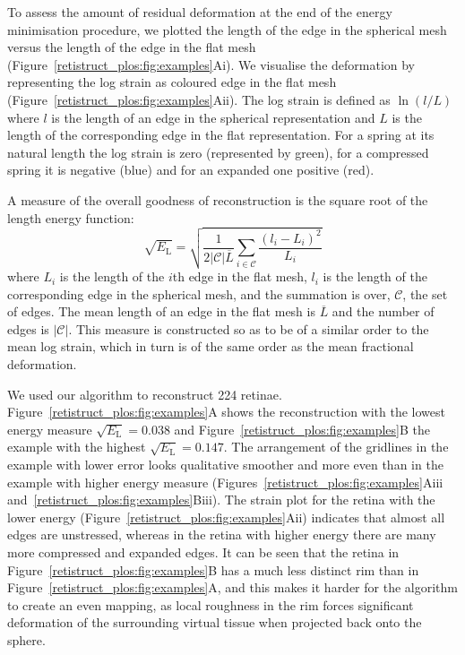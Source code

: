 \documentclass[10pt]{article}
\begin{document}
To assess the amount of residual deformation at the end of the energy
minimisation procedure, we plotted the length of the edge in the
spherical mesh versus the length of the edge in the flat mesh
(Figure~\ref{retistruct_plos:fig:examples}Ai). We visualise the
deformation by representing the log strain as coloured edge in the
flat mesh (Figure~\ref{retistruct_plos:fig:examples}Aii). The log
strain is defined as $\ln(l/L)$ where $l$ is the length of an edge in
the spherical representation and $L$ is the length of the
corresponding edge in the flat representation. For a spring at its
natural length the log strain is zero (represented by green), for a
compressed spring it is negative (blue) and for an expanded one
positive (red).

A measure of the overall goodness of reconstruction is the square root
of the length energy function:
\begin{equation} 
  \sqrt{E_\mathrm{L}} = \sqrt{\frac{1}{2|\mathcal{C}|\overline{L}}
  \sum_{i\in\mathcal{C}} \frac{(l_i - L_i)^2}{L_i}}
\end{equation} 
where $L_i$ is the length of the $i$th edge in the flat mesh, $l_i$ is
the length of the corresponding edge in the spherical mesh, and the
summation is over, $\mathcal{C}$, the set of edges. The mean length of
an edge in the flat mesh is $\overline{L}$ and the number of edges is
$|\mathcal{C}|$. This measure is constructed so as to be of a similar
order to the mean log strain, which in turn is of the same order as
the mean fractional deformation.  

We used our algorithm to reconstruct 224 retinae.
Figure~\ref{retistruct_plos:fig:examples}A shows the reconstruction
with the lowest energy measure $\sqrt{E_\mathrm{L}}=0.038$ and
Figure~\ref{retistruct_plos:fig:examples}B the example with the
highest $\sqrt{E_\mathrm{L}}=0.147$. The arrangement of the gridlines
in the example with lower error looks qualitative smoother and more
even than in the example with higher energy measure
(Figures~\ref{retistruct_plos:fig:examples}Aiii
and~\ref{retistruct_plos:fig:examples}Biii). The strain plot for the
retina with the lower energy
(Figure~\ref{retistruct_plos:fig:examples}Aii) indicates that almost
all edges are unstressed, whereas in the retina with higher energy
there are many more compressed and expanded edges. It can be seen that
the retina in Figure~\ref{retistruct_plos:fig:examples}B has a much
less distinct rim than in Figure~\ref{retistruct_plos:fig:examples}A,
and this makes it harder for the algorithm to create an even mapping,
as local roughness in the rim forces significant deformation of the
surrounding virtual tissue when projected back onto the sphere.
\end{document}
